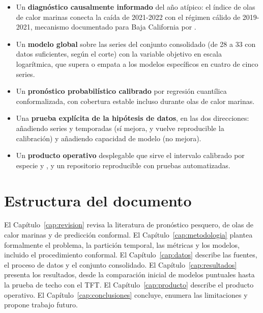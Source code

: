 \begin{itemize}
  \item Un \textbf{diagnóstico causalmente informado} del año atípico: el índice de olas de
  calor marinas conecta la caída de 2021-2022 con el régimen cálido de 2019-2021, mecanismo
  documentado para Baja California por \citet{villasenor2024}.
  \item Un \textbf{modelo global} sobre las series del conjunto consolidado (de 28 a 33
  con datos suficientes, según el corte) con la variable objetivo en escala logarítmica, que
  supera o empata a los modelos específicos en cuatro de cinco series.
  \item Un \textbf{pronóstico probabilístico calibrado} por regresión cuantílica
  conformalizada, con cobertura estable incluso durante olas de calor marinas.
  \item Una \textbf{prueba explícita de la hipótesis de datos}, en las dos direcciones:
  añadiendo series y temporadas (sí mejora, y vuelve reproducible la calibración) y añadiendo
  capacidad de modelo (no mejora).
  \item Un \textbf{producto operativo} desplegable que sirve el intervalo calibrado por
  especie y \ue{}, y un repositorio reproducible con pruebas automatizadas.
\end{itemize}

\section{Estructura del documento}

El Capítulo~\ref{cap:revision} revisa la literatura de pronóstico pesquero, de olas de calor
marinas y de predicción conformal. El Capítulo~\ref{cap:metodologia} plantea formalmente el
problema, la partición temporal, las métricas y los modelos, incluido el procedimiento
conformal. El Capítulo~\ref{cap:datos} describe las fuentes, el proceso de datos y el conjunto
consolidado. El Capítulo~\ref{cap:resultados} presenta los resultados, desde la comparación
inicial de modelos puntuales hasta la prueba de techo con el TFT. El
Capítulo~\ref{cap:producto} describe el producto operativo. El Capítulo~\ref{cap:conclusiones}
concluye, enumera las limitaciones y propone trabajo futuro.
